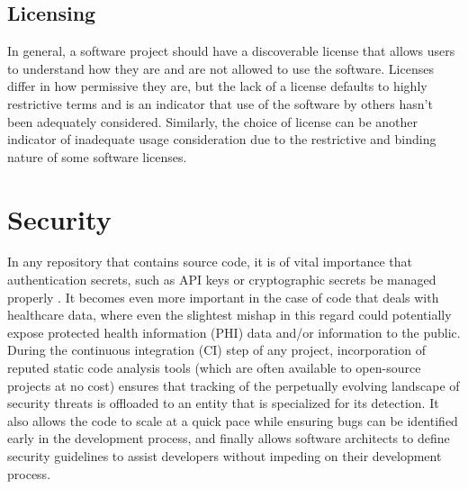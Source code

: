 \documentclass{article}
\begin{document}
\subsection{Licensing}
In general, a software project should have a discoverable license that allows users to understand how they are and are not allowed to use the software. Licenses differ in how permissive they are, but the lack of a license defaults to highly restrictive terms and is an indicator that use of the software by others hasn’t been adequately considered. Similarly, the choice of license can be another indicator of inadequate usage consideration due to the restrictive and binding nature of some software licenses. 


\section{Security}
In any repository that contains source code, it is of vital importance that authentication secrets, such as API keys or cryptographic secrets be managed properly \cite{merkel_docker_nodate}. It becomes even more important in the case of code that deals with healthcare data, where even the slightest mishap in this regard could potentially expose protected health information (PHI) data and/or information to the public. During the continuous integration (CI) step of any project, incorporation of reputed static code analysis tools \cite{louridas_static_2006, ludwig_compiling_2017} (which are often available to open-source projects at no cost) ensures that tracking of the perpetually evolving landscape of security threats is offloaded to an entity that is specialized for its detection. It also allows the code to scale at a quick pace while ensuring bugs can be identified early in the development process, and finally allows software architects to define security guidelines to assist developers without impeding on their development process.
\end{document}
